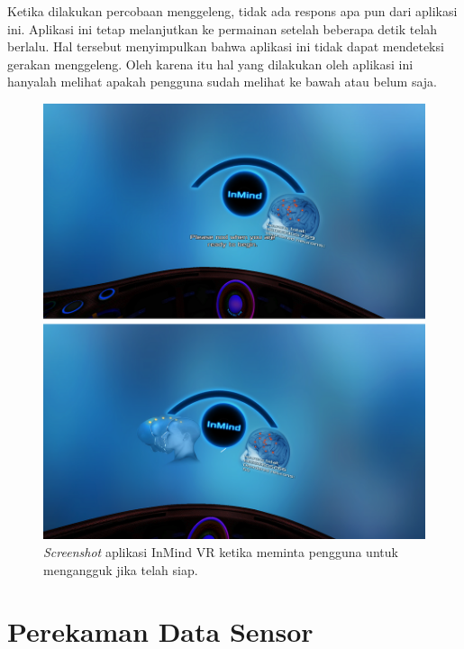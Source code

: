 Ketika dilakukan percobaan menggeleng, tidak ada respons apa pun dari aplikasi ini. Aplikasi ini tetap melanjutkan ke permainan setelah beberapa detik telah berlalu. Hal tersebut menyimpulkan bahwa aplikasi ini tidak dapat mendeteksi gerakan menggeleng. Oleh karena itu hal yang dilakukan oleh aplikasi ini hanyalah melihat apakah pengguna sudah melihat ke bawah atau belum saja.

\begin{figure}[htbp]
\centering
\includegraphics[scale=0.6]{Gambar/screenshot-inmind-nod.png}
\caption{\textit{Screenshot} aplikasi InMind VR ketika meminta pengguna untuk mengangguk jika telah siap.}
\label{fig:screenshot_inmind_nod}
\end{figure}



\section{Perekaman Data Sensor}
\label{sec:perekaman_data_sensor}

